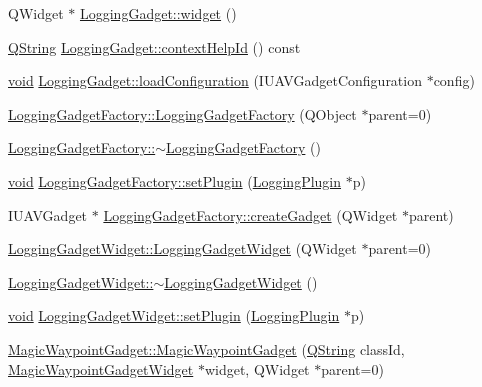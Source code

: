 \begin{DoxyCompactItemize}
\-Q\-Widget $\ast$ \hyperlink{group___g_c_s_control_gadget_plugin_gaaa54cb505c0bcf94b159b6fb51cea991}{\-Logging\-Gadget\-::widget} ()
\item 
\hyperlink{group___u_a_v_objects_plugin_gab9d252f49c333c94a72f97ce3105a32d}{\-Q\-String} \hyperlink{group___g_c_s_control_gadget_plugin_gaf63d806b2f5ac3cdf4c71fe9a241f7a8}{\-Logging\-Gadget\-::context\-Help\-Id} () const 
\item 
\hyperlink{group___u_a_v_objects_plugin_ga444cf2ff3f0ecbe028adce838d373f5c}{void} \hyperlink{group___g_c_s_control_gadget_plugin_ga7e66a1250e46435b2c92ff170afafeec}{\-Logging\-Gadget\-::load\-Configuration} (\-I\-U\-A\-V\-Gadget\-Configuration $\ast$config)
\item 
\hyperlink{group___g_c_s_control_gadget_plugin_gaef9e98419a7dd5551cd13876c2c4b357}{\-Logging\-Gadget\-Factory\-::\-Logging\-Gadget\-Factory} (\-Q\-Object $\ast$parent=0)
\item 
\hyperlink{group___g_c_s_control_gadget_plugin_ga6ddd468f9f7b722281dc55df5d991dc1}{\-Logging\-Gadget\-Factory\-::$\sim$\-Logging\-Gadget\-Factory} ()
\item 
\hyperlink{group___u_a_v_objects_plugin_ga444cf2ff3f0ecbe028adce838d373f5c}{void} \hyperlink{group___g_c_s_control_gadget_plugin_ga00c5e0af9d177e7d271c0d6dcd6f4601}{\-Logging\-Gadget\-Factory\-::set\-Plugin} (\hyperlink{class_logging_plugin}{\-Logging\-Plugin} $\ast$p)
\item 
\-I\-U\-A\-V\-Gadget $\ast$ \hyperlink{group___g_c_s_control_gadget_plugin_ga95ee0680e9c323e77341bef36195bdf5}{\-Logging\-Gadget\-Factory\-::create\-Gadget} (\-Q\-Widget $\ast$parent)
\item 
\hyperlink{group___g_c_s_control_gadget_plugin_ga82895cf265acb40f6491abf90e3b018e}{\-Logging\-Gadget\-Widget\-::\-Logging\-Gadget\-Widget} (\-Q\-Widget $\ast$parent=0)
\item 
\hyperlink{group___g_c_s_control_gadget_plugin_gafa54fcc426f5064c9706b1528834d6a0}{\-Logging\-Gadget\-Widget\-::$\sim$\-Logging\-Gadget\-Widget} ()
\item 
\hyperlink{group___u_a_v_objects_plugin_ga444cf2ff3f0ecbe028adce838d373f5c}{void} \hyperlink{group___g_c_s_control_gadget_plugin_ga9ff08b035e0189200c2f5d2e2b234dac}{\-Logging\-Gadget\-Widget\-::set\-Plugin} (\hyperlink{class_logging_plugin}{\-Logging\-Plugin} $\ast$p)
\item 
\hyperlink{group___g_c_s_control_gadget_plugin_ga7c890e89a9d75c8e6498c9b894ba70ce}{\-Magic\-Waypoint\-Gadget\-::\-Magic\-Waypoint\-Gadget} (\hyperlink{group___u_a_v_objects_plugin_gab9d252f49c333c94a72f97ce3105a32d}{\-Q\-String} class\-Id, \hyperlink{class_magic_waypoint_gadget_widget}{\-Magic\-Waypoint\-Gadget\-Widget} $\ast$widget, \-Q\-Widget $\ast$parent=0)

\end{DoxyCompactItemize}

